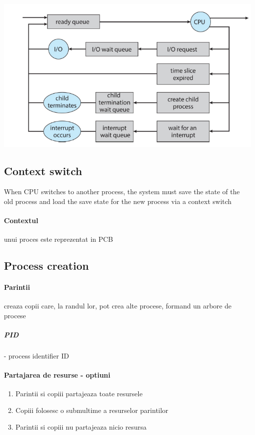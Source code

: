 \documentclass{article}
\begin{document}
\begin{center}
    \includegraphics[scale=0.3]{4_indepthprocsched.png}
\end{center}

\subsection*{Context switch} When CPU switches to another process, the system must save the state of the old process and load the save state for the new process via a context switch
\paragraph*{Contextul} unui proces este reprezentat in PCB

\subsection*{Process creation}
\paragraph*{Parintii} creaza copii care, la randul lor, pot crea alte procese, formand un arbore de procese
\subparagraph*{PID} - process identifier ID
\paragraph*{Partajarea de resurse - optiuni}
\begin{enumerate}
    \item Parintii si copiii partajeaza toate resursele
    \item Copiii folosesc o submultime a resurselor parintilor
    \item Parintii si copiii nu partajeaza nicio resursa
\end{enumerate}
\end{document}
